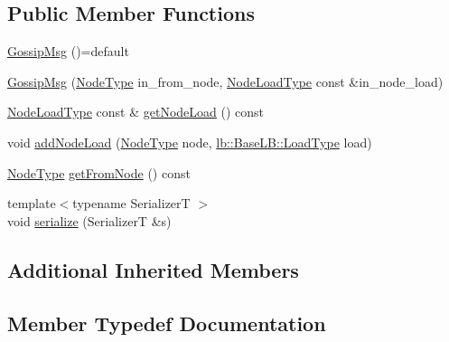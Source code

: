 \subsection*{Public Member Functions}
\begin{DoxyCompactItemize}
\item 
\hyperlink{structvt_1_1vrt_1_1collection_1_1balance_1_1_gossip_msg_ae5d9af18865ffcbf49139e587d6117b6}{Gossip\+Msg} ()=default
\item 
\hyperlink{structvt_1_1vrt_1_1collection_1_1balance_1_1_gossip_msg_a9ffebd54d8397a1e5efbd089524e53f2}{Gossip\+Msg} (\hyperlink{namespacevt_a866da9d0efc19c0a1ce79e9e492f47e2}{Node\+Type} in\+\_\+from\+\_\+node, \hyperlink{structvt_1_1vrt_1_1collection_1_1balance_1_1_gossip_msg_a8deef056cb137cfd67540a31be189122}{Node\+Load\+Type} const \&in\+\_\+node\+\_\+load)
\item 
\hyperlink{structvt_1_1vrt_1_1collection_1_1balance_1_1_gossip_msg_a8deef056cb137cfd67540a31be189122}{Node\+Load\+Type} const  \& \hyperlink{structvt_1_1vrt_1_1collection_1_1balance_1_1_gossip_msg_ad73dc00723416733adfc985a632d22e4}{get\+Node\+Load} () const
\item 
void \hyperlink{structvt_1_1vrt_1_1collection_1_1balance_1_1_gossip_msg_ad71cb026dce420d7c5e48d0fd87c2e61}{add\+Node\+Load} (\hyperlink{namespacevt_a866da9d0efc19c0a1ce79e9e492f47e2}{Node\+Type} node, \hyperlink{structvt_1_1vrt_1_1collection_1_1lb_1_1_base_l_b_a215e22b9f12678303f49615ae3be05cc}{lb\+::\+Base\+L\+B\+::\+Load\+Type} load)
\item 
\hyperlink{namespacevt_a866da9d0efc19c0a1ce79e9e492f47e2}{Node\+Type} \hyperlink{structvt_1_1vrt_1_1collection_1_1balance_1_1_gossip_msg_a025c5e1da0c0967bed68ba50666c92e5}{get\+From\+Node} () const
\item 
{\footnotesize template$<$typename SerializerT $>$ }\\void \hyperlink{structvt_1_1vrt_1_1collection_1_1balance_1_1_gossip_msg_a62aa6836c3898a1116fb20c0e03ba219}{serialize} (SerializerT \&s)
\end{DoxyCompactItemize}
\subsection*{Additional Inherited Members}


\subsection{Member Typedef Documentation}
\mbox{\label{structvt_1_1vrt_1_1collection_1_1balance_1_1_gossip_msg_a8deef056cb137cfd67540a31be189122}} 
